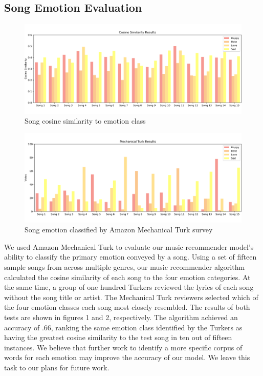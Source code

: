 \documentclass[10pt,twocolumn]{article}
\begin{document}
\subsection{Song Emotion Evaluation}

\begin{figure}[!ht]
\centering
\includegraphics[width=6.5in]{test_cos.png}
\caption{Song cosine similarity to emotion class}
\label{fig:digraph}
\end{figure}
\begin{figure}[!ht]
\centering
\includegraphics[width=6.5in]{test_vote.png}
\caption{Song emotion classified by Amazon Mechanical Turk survey}
\label{fig:digraph}
\end{figure}

We used Amazon Mechanical Turk to evaluate our music recommender model's ability to classify the primary emotion conveyed by a song. Using a set of fifteen sample songs from across multiple genres, our music recommender algorithm calculated the cosine similarity of each song to the four emotion categories. At the same time, a group of one hundred Turkers reviewed the lyrics of each song without the song title or artist.  The Mechanical Turk reviewers selected which of the four emotion classes each song most closely resembled. The results of both tests are shown in figures 1 and 2, respectively. The algorithm achieved an accuracy of .66, ranking the same emotion class identified by the Turkers as having the greatest cosine similarity to the test song in ten out of fifteen instances.  We believe that further work to identify a more specific corpus of words for each emotion may improve the accuracy of our model.  We leave this task to our plans for future work.
\end{document}
